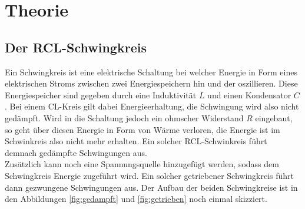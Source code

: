 \section{Theorie}
\label{sec:Theorie}
\subsection{Der RCL-Schwingkreis}
\label{sec:RCL}
Ein Schwingkreis ist eine elektrische Schaltung bei welcher Energie in Form eines elektrischen Stroms zwischen zwei Energiespeichern hin 
und der oszillieren. Diese Energiespeicher sind gegeben durch eine Induktivität $L$ und einen Kondensator $C$. Bei einem CL-Kreis gilt dabei
Energieerhaltung, die Schwingung wird also nicht gedämpft. Wird in die Schaltung jedoch ein ohmscher Widerstand $R$ eingebaut, so geht über 
diesen Energie in Form von Wärme verloren, die Energie ist im Schwinkreis also nicht mehr erhalten. Ein solcher RCL-Schwinkreis führt demnach
gedämpfte Schwingungen aus.\\\noindent
Zusätzlich kann noch eine Spannungsquelle hinzugefügt werden, sodass dem Schwingkreis Energie zugeführt wird. Ein solcher getriebener 
Schwingkreis führt dann gezwungene Schwingungen aus. Der Aufbau der beiden Schwingkreise ist in den Abbildungen \ref{fig:gedampft} und 
\ref{fig:getrieben} noch einmal skizziert.
